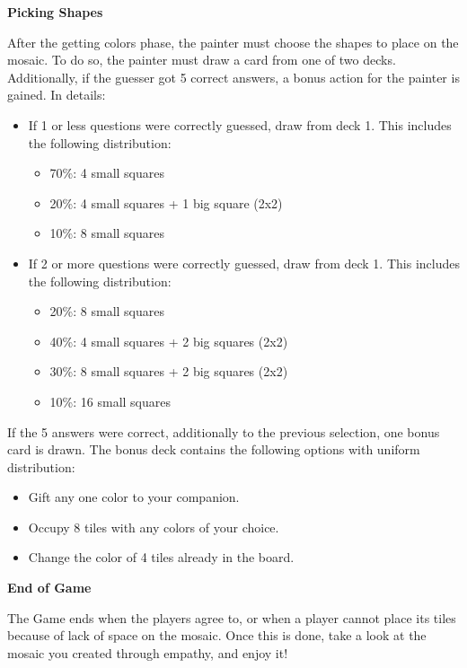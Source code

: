 \documentclass{article}
\newcommand{\lvl}[1]{\vspace{0.5cm}\Large{\textbf{#1}}\vspace{0.2cm}}
\begin{document}
\lvl{Picking Shapes}

After the getting colors phase, the painter must choose the shapes to place on the mosaic. To do so, the painter must draw a card from one of two decks. Additionally, if the guesser got 5 correct answers, a bonus action for the painter is gained. In details:

\begin{itemize}
    \item If 1 or less questions were correctly guessed, draw from deck 1. This includes the following distribution:
    \begin{itemize}
        \item 70\%: 4 small squares
        \item 20\%: 4 small squares + 1 big square (2x2)
        \item 10\%: 8 small squares
    \end{itemize}
    \item If 2 or more questions were correctly guessed, draw from deck 1. This includes the following distribution:
    \begin{itemize}
        \item 20\%: 8 small squares
        \item 40\%: 4 small squares + 2 big squares (2x2)
        \item 30\%: 8 small squares + 2 big squares (2x2)
        \item 10\%: 16 small squares
    \end{itemize}
\end{itemize}

If the 5 answers were correct, additionally to the previous selection, one bonus card is drawn. The bonus deck contains the following options with uniform distribution:
\begin{itemize}
    \item Gift any one color to your companion.
    \item Occupy 8 tiles with any colors of your choice.
    \item Change the color of 4 tiles already in the board.
\end{itemize}


\lvl{End of Game}

The Game ends when the players agree to, or when a player cannot place its tiles because of lack of space on the mosaic. Once this is done, take a look at the mosaic you created through empathy, and enjoy it!

% 
% 
\end{document}
